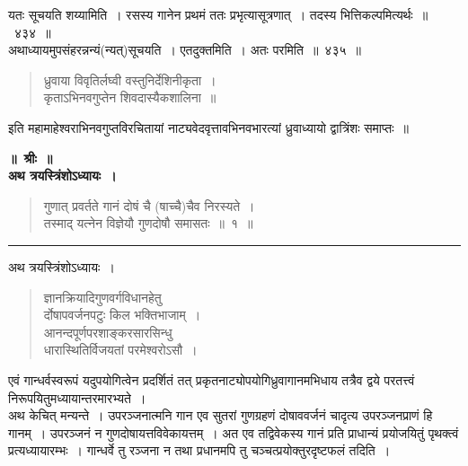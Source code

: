 \documentclass[11pt, openany]{book}
\begin{document}
यतः सूचयति {\qtt शय्यामिति}~। रसस्य गानेन प्रथमं ततः प्रभृत्यासूत्रणात्~। तदस्य भित्तिकल्पमित्यर्थः~॥~४३४~॥\\

अथाध्यायमुपसंहरन्नन्यं(न्यत्)सूचयति~। {\qtt एतदुक्तमिति}~। अतः {\qtt परमिति}~॥~४३५~॥

\begin{quote}
{\qt ध्रुवाया विवृतिर्लघ्वी वस्तुनिर्देशिनीकृता~। \\
 कृताऽभिनवगुप्तेन शिवदास्यैकशालिना~॥}
\end{quote}

\begin{center}
 इति महामाहेश्वराभिनवगुप्तविरचितायां नाट्यवेदवृत्तावभिनवभारत्यां ध्रुवाध्यायो द्वात्रिंशः समाप्तः~॥
\end{center}

\newpage
\thispagestyle{empty}

\begin{center}
\textbf{\LARGE ॥~श्रीः~॥}\\

\vspace{2mm}
\textbf{\LARGE अथ त्रयस्त्रिंशोऽध्यायः~।}
\end{center}

\begin{quote}
{\na गुणात् प्रवर्तते गानं दोषं चै (षाच्चै)चैव निरस्यते~। \\
 तस्माद् यत्नेन विज्ञेयौ गुणदोषौ समासतः~॥~१~॥}
\end{quote}

\hrule

\begin{center}
 अथ त्रयस्त्रिंशोऽध्यायः~। 
\end{center}

\begin{quote}
{\qt ज्ञानक्रियादिगुणवर्गविधानहेतु\textendash \\
 र्दोषापवर्जनपटुः किल भक्तिभाजाम्~।\\
 आनन्दपूर्णपरशाङ्करसारसिन्धु\textendash \\
 धारास्थितिर्विजयतां परमेश्वरोऽसौ~।}
\end{quote}

एवं गान्धर्वस्वरूपं यदुपयोगित्वेन प्रदर्शितं तत् प्रकृतनाट्योपयोगिध्रुवागानमभिधाय तत्रैव द्वये परतत्त्वं निरूपयितुमध्यायान्तरमारभ्यते~।\\

अथ {\qtt केचित्} मन्यन्ते~। उपरञ्जनात्मनि गान एव सुतरां गुणग्रहणं दोषाववर्जनं चादृत्य उपरञ्जनप्राणं हि गानम्~। उपरञ्जनं न गुणदोषायत्तविवेकायत्तम्~। अत एव तद्विवेकस्य गानं प्रति प्राधान्यं प्रयोजयितुं पृथक्त्वं प्रत्यध्यायारम्भः~। गान्धर्वे तु रञ्जना न तथा प्रधानमपि तु चञ्चत्प्रयोक्तुरदृष्टफलं तदिति~।\\
\end{document}
